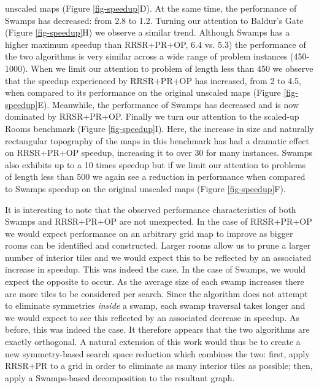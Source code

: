 unscaled maps (Figure \ref{fig-speedup}D). 
At the same time, the performance of Swamps has decreased: from 2.8 to 1.2.
Turning our attention to Baldur's Gate (Figure \ref{fig-speedup}H) we observe a similar trend.
Although Swamps has a higher maximum speedup than RRSR+PR+OP, 6.4 vs. 5.3) the performance of the two 
algorithms is very similar across a wide range of problem instances (450-1000).
When we limit our attention to problem of length less than 450 we observe that the speedup experienced by
RRSR+PR+OP has increased, from 2 to 4.5, when compared to its performance on the original unscaled maps
(Figure \ref{fig-speedup}E).
Meanwhile, the performance of Swamps has decreased and is now dominated by RRSR+PR+OP.
Finally we turn our attention to the scaled-up Rooms benchmark (Figure \ref{fig-speedup}I).
Here, the increase in size and naturally rectangular topography of the maps in this benchmark
has had a dramatic effect on RRSR+PR+OP speedup, increasing it to over 30 for many instances.
Swamps also exhibits up to a 10 times speedup but if we limit our attention to problems of
length less than 500 we again see a reduction in performance when compared to Swamps speedup
on the original unscaled maps (Figure \ref{fig-speedup}F). 
\par
It is interesting to note that the observed performance characteristics of both Swamps and RRSR+PR+OP
are not unexpected.
In the case of RRSR+PR+OP we would expect performance on an arbitrary grid map to improve as bigger
rooms can be identified and constructed. 
Larger rooms allow us to prune a larger number of interior tiles and we would expect this to be reflected
by an associated increase in speedup. This was indeed the case.
In the case of Swamps, we would expect the opposite to occur. As the average size of each swamp increases
there are more tiles to be considered per search. Since the algorithm does not attempt to eliminate symmetries
\emph{inside} a swamp, each swamp traversal takes longer and we would expect to see this reflected
by an associated decrease in speedup. As before, this was indeed the case.
It therefore appears that the two algorithms are exactly orthogonal.
A natural extension of this work would thus be to create a new symmetry-based search space reduction
which combines the two: first, apply RRSR+PR to a grid in order to eliminate as many interior tiles 
as possible; then, apply a Swamps-based decomposition to the resultant graph.

